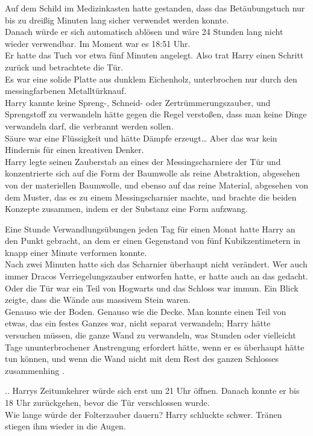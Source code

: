 {Auf dem Schild im Medizinkasten hatte gestanden, dass das Betäubungstuch nur bis zu dreißig Minuten lang sicher verwendet werden konnte.\\ Danach würde er sich automatisch ablösen und wäre 24 Stunden lang nicht wieder verwendbar. Im Moment war es 18:51 Uhr.\\ Er hatte das Tuch vor etwa fünf Minuten angelegt. Also trat Harry einen Schritt zurück und betrachtete die Tür.\\ Es war eine solide Platte aus dunklem Eichenholz, unterbrochen nur durch den messingfarbenen Metalltürknauf.\\ Harry kannte keine Spreng-, Schneid- oder Zertrümmerungszauber, und Sprengstoff zu verwandeln hätte gegen die Regel verstoßen, dass man keine Dinge verwandeln darf, die verbrannt werden sollen.\\ Säure war eine Flüssigkeit und hätte Dämpfe erzeugt… Aber das war kein Hindernis für einen kreativen Denker.\\ Harry legte seinen Zauberstab an eines der Messingscharniere der Tür und konzentrierte sich auf die Form der Baumwolle als reine Abstraktion, abgesehen von der materiellen Baumwolle, und ebenso auf das reine Material, abgesehen von dem Muster, das es zu einem Messingscharnier machte, und brachte die beiden Konzepte zusammen, indem er der Substanz eine Form aufzwang.

Eine Stunde Verwandlungsübungen jeden Tag für einen Monat hatte Harry an den Punkt gebracht, an dem er einen Gegenstand von fünf Kubikzentimetern in knapp einer Minute verformen konnte.\\ Nach zwei Minuten hatte sich das Scharnier überhaupt nicht verändert. Wer auch immer Dracos Verriegelungszauber entworfen hatte, er hatte auch an das gedacht.\\ Oder die Tür war ein Teil von Hogwarts und das Schloss war immun. Ein Blick zeigte, dass die Wände aus massivem Stein waren.\\ Genauso wie der Boden. Genauso wie die Decke. Man konnte einen Teil von etwas, das ein festes Ganzes war, nicht separat verwandeln; Harry hätte versuchen müssen, die ganze Wand zu verwandeln, was Stunden oder vielleicht Tage ununterbrochener Anstrengung erfordert hätte, wenn er es überhaupt hätte tun können, und wenn die Wand nicht mit dem Rest des ganzen Schlosses zusammenhing .

.. Harrys Zeitumkehrer würde sich erst um 21 Uhr öffnen. Danach konnte er bis 18 Uhr zurückgehen, bevor die Tür verschlossen wurde.\\ Wie lange würde der Folterzauber dauern? Harry schluckte schwer. Tränen stiegen ihm wieder in die Augen.

}
